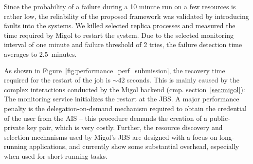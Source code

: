 \documentclass{rspublic}
\begin{document}
Since the probability of a failure during a 10 minute run on a few
resources is rather low, the reliability of the proposed framework was
validated by introducing faults into the systems. We killed selected
replica processes and measured the time required by Migol to restart
the system.  Due to the selected monitoring interval of one minute and
failure threshold of 2 tries, the failure detection time averages to
2.5\, minutes.

As shown in Figure~\ref{fig:performance_perf_submission}, the recovery
time required for the restart of the job is $\sim42$ seconds. This is
mainly caused by the complex interactions conducted by the Migol
backend (cmp. section~\ref{sec:migol}): The monitoring service
initializes the restart at the JBS.  A major performance penalty is
the delegation-on-demand mechanism required to obtain the credential
of the user from the AIS -- this procedure demands the creation of a
public-private key pair, which is very costly. Further, the resource
discovery and selection mechanisms used by Migol's JBS are designed
with a focus on long-running applications, and currently show some
substantial overhead, especially when used for short-running tasks.



\end{document}
